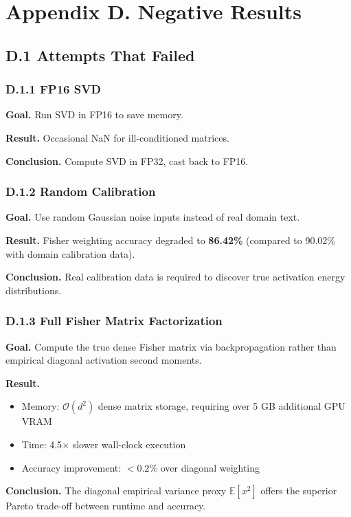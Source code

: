 \section{Appendix D. Negative Results}

\subsection{D.1 Attempts That Failed}

\subsubsection{D.1.1 FP16 SVD}

\textbf{Goal.} Run SVD in FP16 to save memory.

\textbf{Result.} Occasional NaN for ill-conditioned matrices.

\textbf{Conclusion.} Compute SVD in FP32, cast back to FP16.

\subsubsection{D.1.2 Random Calibration}

\textbf{Goal.} Use random Gaussian noise inputs instead of real domain text.

\textbf{Result.} Fisher weighting accuracy degraded to \textbf{86.42\%} (compared to 90.02\% with domain calibration data).

\textbf{Conclusion.} Real calibration data is required to discover true activation energy distributions.

\subsubsection{D.1.3 Full Fisher Matrix Factorization}

\textbf{Goal.} Compute the true dense Fisher matrix via backpropagation rather than empirical diagonal activation second moments.

\textbf{Result.} 
\begin{itemize}
\item Memory: $\mathcal{O}(d^2)$ dense matrix storage, requiring over 5 GB additional GPU VRAM
\item Time: 4.5$\times$ slower wall-clock execution
\item Accuracy improvement: $<0.2\%$ over diagonal weighting
\end{itemize}
\textbf{Conclusion.} The diagonal empirical variance proxy $\mathbb{E}[x^2]$ offers the superior Pareto trade-off between runtime and accuracy.

